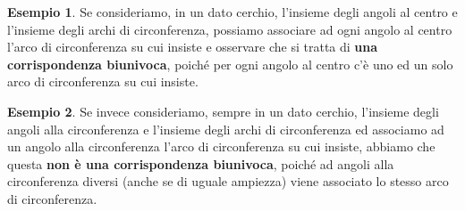 \documentclass[a4paper,12pt]{article}
\theoremstyle{definition}
\newtheorem{esempio}{Esempio}[section]
\theoremstyle{remark}
\begin{document}
\begin{esempio}
Se consideriamo, in un dato cerchio, l'insieme degli angoli al centro e l'insieme degli archi di circonferenza, possiamo associare ad ogni angolo al centro l'arco di circonferenza su cui insiste e osservare che si tratta di \textbf{una corrispondenza biunivoca}, poiché per ogni angolo al centro c'è uno ed un solo arco di circonferenza su cui insiste.

\begin{center}
\end{center}
\end{esempio}

\begin{esempio}
Se invece consideriamo, sempre in un dato cerchio, l'insieme degli angoli alla circonferenza e l'insieme degli archi di circonferenza ed associamo ad un angolo alla circonferenza l'arco di circonferenza su cui insiste, abbiamo che questa \textbf{non è una corrispondenza biunivoca}, poiché ad angoli alla circonferenza diversi (anche se di uguale ampiezza) viene associato lo stesso arco di circonferenza.

\begin{center}
\end{center}
\end{esempio}
\end{document}
